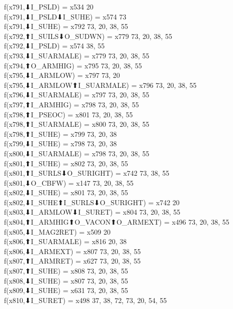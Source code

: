 f(x791,⬇I_PSLD) = x534 {20} \\
f(x791,⬇I_PSLD⬇I_SUHE) = x574 {73} \\
f(x791,⬇I_SUHE) = x792 {73, 20, 38, 55} \\
f(x792,⬆I_SUILS⬇O_SUDWN) = x779 {73, 20, 38, 55} \\
f(x792,⬇I_PSLD) = x574 {38, 55} \\
f(x793,⬇I_SUARMALE) = x779 {73, 20, 38, 55} \\
f(x794,⬆O_ARMHIG) = x795 {73, 20, 38, 55} \\
f(x795,⬇I_ARMLOW) = x797 {73, 20} \\
f(x795,⬇I_ARMLOW⬆I_SUARMALE) = x796 {73, 20, 38, 55} \\
f(x796,⬇I_SUARMALE) = x797 {73, 20, 38, 55} \\
f(x797,⬆I_ARMHIG) = x798 {73, 20, 38, 55} \\
f(x798,⬆I_PSEOC) = x801 {73, 20, 38, 55} \\
f(x798,⬆I_SUARMALE) = x800 {73, 20, 38, 55} \\
f(x798,⬆I_SUHE) = x799 {73, 20, 38} \\
f(x799,⬇I_SUHE) = x798 {73, 20, 38} \\
f(x800,⬇I_SUARMALE) = x798 {73, 20, 38, 55} \\
f(x801,⬆I_SUHE) = x802 {73, 20, 38, 55} \\
f(x801,⬆I_SURLS⬇O_SURIGHT) = x742 {73, 38, 55} \\
f(x801,⬇O_CBFW) = x147 {73, 20, 38, 55} \\
f(x802,⬇I_SUHE) = x801 {73, 20, 38, 55} \\
f(x802,⬇I_SUHE⬆I_SURLS⬇O_SURIGHT) = x742 {20} \\
f(x803,⬇I_ARMLOW⬇I_SURET) = x804 {73, 20, 38, 55} \\
f(x804,⬆I_ARMHIG⬆O_VACON⬆O_ARMEXT) = x496 {73, 20, 38, 55} \\
f(x805,⬇I_MAG2RET) = x509 {20} \\
f(x806,⬆I_SUARMALE) = x816 {20, 38} \\
f(x806,⬇I_ARMEXT) = x807 {73, 20, 38, 55} \\
f(x807,⬆I_ARMRET) = x627 {73, 20, 38, 55} \\
f(x807,⬆I_SUHE) = x808 {73, 20, 38, 55} \\
f(x808,⬇I_SUHE) = x807 {73, 20, 38, 55} \\
f(x809,⬇I_SUHE) = x631 {73, 20, 38, 55} \\
f(x810,⬇I_SURET) = x498 {37, 38, 72, 73, 20, 54, 55} \\
